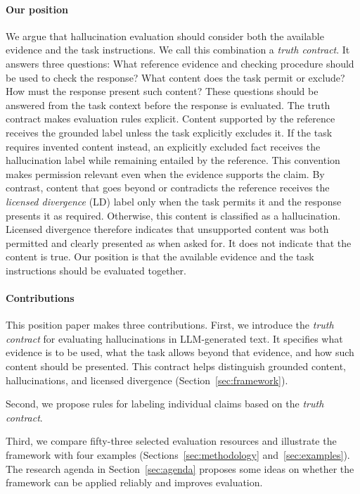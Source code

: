 \documentclass{clv2025}
\newcommand{\LD}{\textsc{LD}}
\begin{document}
\paragraph{Our position}
We argue that hallucination evaluation should consider both the available
evidence and the task instructions. We call this combination a \emph{truth
contract}. It answers three questions: What reference evidence and checking procedure should be used to check the response? What content does the task permit or exclude? How must the response present such content?
These questions should be answered from the task context
before the response is evaluated.
The truth contract makes evaluation rules explicit. Content supported by the reference receives the grounded label unless the task explicitly excludes it.
If the task requires invented content instead, an explicitly excluded fact
receives the hallucination label while remaining entailed by the reference.
This convention makes permission relevant even when the evidence supports
the claim.
By contrast, content that goes beyond or contradicts the reference receives the \emph{licensed divergence} (\LD) label only when the task permits it and the response presents it as required.
Otherwise, this content is classified as a
hallucination. Licensed divergence therefore indicates
that unsupported content was both permitted and clearly presented as when asked for. It
does not indicate that the content is true. Our position is that the available evidence and the task instructions should
be evaluated together.

\paragraph{Contributions}
This position paper makes three contributions. First, we introduce the
\emph{truth contract} for evaluating hallucinations in LLM-generated text. It specifies what evidence is to be used, what the task
allows beyond that evidence, and how such content should be presented. This
contract helps distinguish grounded content, hallucinations, and licensed
divergence (Section~\ref{sec:framework}).

Second, we propose rules for labeling individual claims based on the \emph{truth contract}.


Third, we compare fifty-three selected evaluation resources and illustrate the
framework with four examples
(Sections~\ref{sec:methodology} and~\ref{sec:examples}).
The research agenda in Section~\ref{sec:agenda} proposes some ideas on whether the framework can be applied reliably and improves evaluation.
\end{document}
